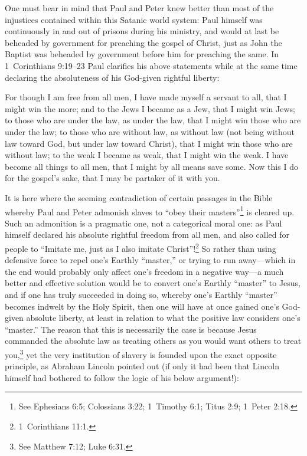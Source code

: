 \documentclass[letterpaper,12pt]{article}
\newenvironment{squote}
  {\small\quote}
  {\endquote\normalsize}
\begin{document}
One must bear in mind that Paul and Peter knew better than most of the injustices contained within this Satanic world system: Paul himself was continuously in and out of prisons during his ministry, and would at last be beheaded by government for preaching the gospel of Christ, just as John the Baptist was beheaded by government before him for preaching the same. In 1~Corinthians 9:19--23 Paul clarifies his above statements while at the same time declaring the absoluteness of his God-given rightful liberty:

\begin{squote}
For though I am free from all men, I have made myself a servant to all, that I might win the more; and to the Jews I became as a Jew, that I might win Jews; to those who are under the law, as under the law, that I might win those who are under the law; to those who are without law, as without law (not being without law toward God, but under law toward Christ), that I might win those who are without law; to the weak I became as weak, that I might win the weak. I have become all things to all men, that I might by all means save some. Now this I do for the gospel's sake, that I may be partaker of it with you.
\end{squote}

It is here where the seeming contradiction of certain passages in the Bible whereby Paul and Peter admonish slaves to ``obey their masters''\footnote{See Ephesians 6:5; Colossians 3:22; 1~Timothy 6:1; Titus 2:9; 1~Peter 2:18.} is cleared up. Such an admonition is a pragmatic one, not a categorical moral one: as Paul himself declared his absolute rightful freedom from all men, and also called for people to ``Imitate me, just as I also imitate Christ''!\footnote{1~Corinthians 11:1.} So rather than using defensive force to repel one's Earthly ``master,'' or trying to run away---which in the end would probably only affect one's freedom in a negative way---a much better and effective solution would be to convert one's Earthly ``master'' to Jesus, and if one has truly succeeded in doing so, whereby one's Earthly ``master'' becomes indwelt by the Holy Spirit, then one will have at once gained one's God-given absolute liberty, at least in relation to what the positive law considers one's ``master.'' The reason that this is necessarily the case is because Jesus commanded the absolute law as treating others as you would want others to treat you,\footnote{See Matthew 7:12; Luke 6:31.} yet the very institution of slavery is founded upon the exact opposite principle, as Abraham Lincoln pointed out (if only it had been that Lincoln himself had bothered to follow the logic of his below argument!):
\end{document}
